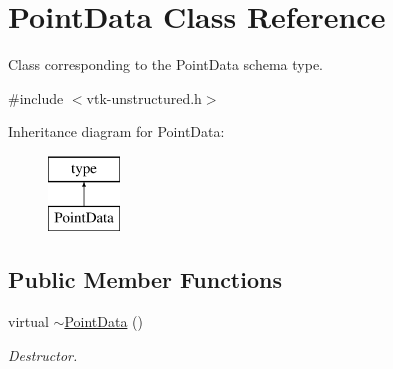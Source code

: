 \hypertarget{classPointData}{\section{Point\-Data Class Reference}
\label{classPointData}
}


Class corresponding to the Point\-Data schema type.  




{\ttfamily \#include $<$vtk-\/unstructured.\-h$>$}

Inheritance diagram for Point\-Data\-:\begin{figure}[H]
\begin{center}
\leavevmode
\includegraphics[height=2.000000cm]{classPointData}
\end{center}
\end{figure}
\subsection*{Public Member Functions}
\begin{DoxyCompactItemize}
\item 
virtual \hyperlink{classPointData_a53f701fd5abdb6105900c13f8282305e}{$\sim$\-Point\-Data} ()
\begin{DoxyCompactList}\small\item\em Destructor. \end{DoxyCompactList}\end{DoxyCompactItemize}
